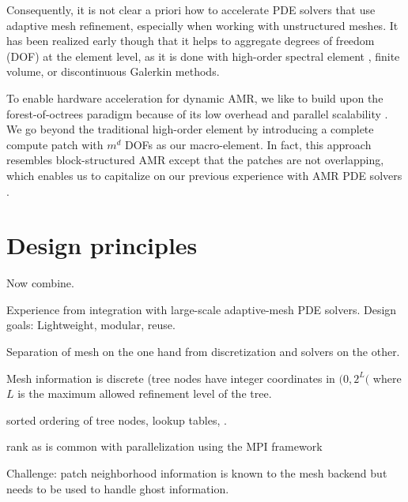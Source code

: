 \documentclass{IOS-Book-Article}     %
\begin{document}
Consequently, it is not clear a priori how to accelerate PDE solvers that use
adaptive mesh refinement, especially when working with unstructured meshes.  It
has been realized early though that it helps to aggregate degrees of freedom
(DOF) at the element level, as it is done with high-order spectral element
\cite{TufoFischer99}, finite volume, or discontinuous Galerkin
\cite{BursteddeGhattasGurnisEtAl10} methods.
%

To enable hardware acceleration for dynamic AMR, we like to build upon the
forest-of-octrees paradigm because of its low overhead and parallel scalability
\cite{BursteddeWilcoxGhattas11}.  We go beyond the traditional high-order
element by introducing a complete compute patch with $m^d$ DOFs as our
macro-element.  In fact, this approach resembles block-structured AMR
\cite{ColellaGravesKeenEtAl07}
except that the patches are not overlapping, which enables us to capitalize on
our previous experience with AMR PDE solvers
\cite{BursteddeStadlerAlisicEtAl13}.

\section*{Design principles}



Now combine.



Experience from integration with large-scale adaptive-mesh PDE solvers.
Design goals: Lightweight, modular, reuse.

Separation of mesh on the one hand from discretization and solvers on the other.

Mesh information is discrete (tree nodes have integer coordinates in
$(0, 2^L($ where $L$ is the maximum allowed refinement level of the tree.

sorted ordering of tree nodes, lookup tables, .



rank as is common with parallelization using the MPI framework

Challenge: patch neighborhood information is known to the mesh backend
but needs to be used to handle ghost information.
\end{document}
